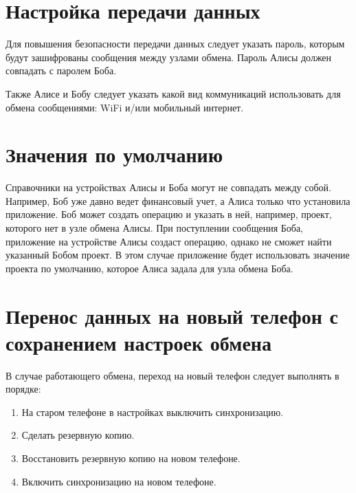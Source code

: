 \documentclass[a4paper,10pt,russian]{sphinxmanual}
\begin{document}
\section{Настройка передачи данных}
\label{\detokenize{teamwork:id9}}
\sphinxAtStartPar
Для повышения безопасности передачи данных следует указать пароль, которым будут зашифрованы сообщения между узлами обмена. Пароль Алисы должен совпадать с паролем Боба.

\sphinxAtStartPar
Также Алисе и Бобу следует указать какой вид коммуникаций использовать для обмена сообщениями: Wi\sphinxhyphen{}Fi и/или мобильный интернет.


\section{Значения по умолчанию}
\label{\detokenize{teamwork:id10}}
\sphinxAtStartPar
Справочники на устройствах Алисы и Боба могут не совпадать между собой. Например, Боб уже давно
ведет финансовый учет, а Алиса только что установила приложение. Боб может создать операцию и указать в ней, например,
проект, которого нет в узле обмена Алисы. При поступлении сообщения Боба, приложение на устройстве Алисы
создаст операцию, однако не сможет найти указанный Бобом проект. В этом случае приложение будет использовать
значение проекта по умолчанию, которое Алиса задала для узла обмена Боба.


\section{Перенос данных на новый телефон с сохранением настроек обмена}
\label{\detokenize{teamwork:id11}}
\sphinxAtStartPar
В случае работающего обмена, переход на новый телефон следует выполнять в порядке:
\begin{enumerate}
%
\item {} 
\sphinxAtStartPar
На старом телефоне в настройках выключить синхронизацию.

\item {} 
\sphinxAtStartPar
Сделать резервную копию.

\item {} 
\sphinxAtStartPar
Восстановить резервную копию на новом телефоне.

\item {} 
\sphinxAtStartPar
Включить синхронизацию на новом телефоне.

\end{enumerate}
\end{document}
